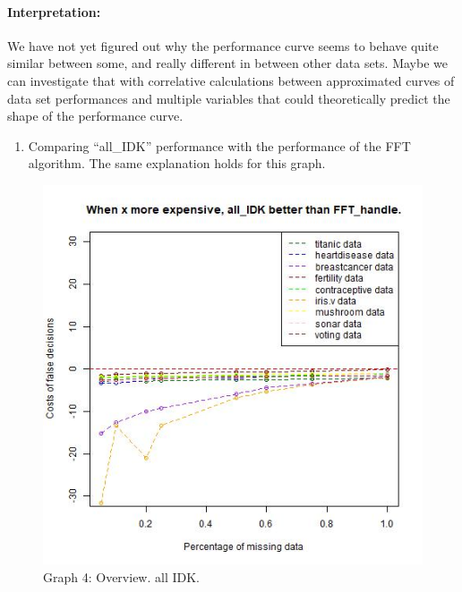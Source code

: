 \documentclass[
]{article}
\providecommand{\tightlist}{%
  \setlength{\itemsep}{0pt}\setlength{\parskip}{0pt}}
\begin{document}
\hypertarget{interpretation}{%
\paragraph{Interpretation:}\label{interpretation}}

We have not yet figured out why the performance curve seems to behave
quite similar between some, and really different in between other data
sets. Maybe we can investigate that with correlative calculations
between approximated curves of data set performances and multiple
variables that could theoretically predict the shape of the performance
curve.

\begin{enumerate}
\def\labelenumi{\arabic{enumi}.}
\setcounter{enumi}{1}
\tightlist
\item
  Comparing ``all\_IDK'' performance with the performance of the FFT
  algorithm. The same explanation holds for this graph.
\end{enumerate}

\begin{figure}
\centering
\includegraphics{graphs/acc_all_IDK_overview.jpg}
\caption{Graph 4: Overview. all IDK.}
\end{figure}
\end{document}
